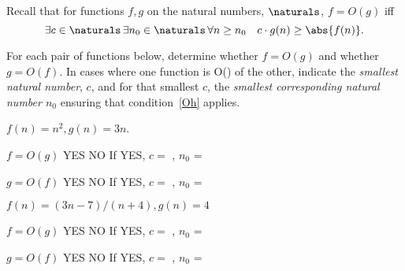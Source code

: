 
\begin{problem}
Recall that for functions $f,g$ on the natural numbers,
$\naturals$, $f = O(g)$ iff
\begin{equation}\label{Oh}
\exists c \in \naturals\, \exists n_0 \in \naturals\,
\forall n \geq n_0\quad c \cdot g(n) \geq \abs{f(n)}.
\end{equation}

For each pair of functions below, determine whether $f = O(g)$ and whether
$g = O(f)$.  In cases where one function is O() of the other, indicate the
\emph{smallest natural number}, $c$, and for that smallest $c$, the
\emph{smallest corresponding natural number $n_0$} ensuring that
condition~\eqref{Oh} applies.

\begin{problemparts}

\problempart $f(n) = n^2, g(n) = 3n$.

$f = O(g)$ \hspace{.5in}YES \hspace{.5in}NO \hspace{.5in} 
If YES, $c =$ \brule{.5in}, $n_0$ = \brule{.5in}


$g = O(f)$ \hspace{.5in}YES \hspace{.5in}NO \hspace{.5in} 
If YES, $c =$ \brule{.5in}, $n_0$ = \brule{.5in}


\problempart $f(n) = (3n - 7) / (n + 4), g(n) = 4$

$f = O(g)$ \hspace{.5in}YES \hspace{.5in}NO \hspace{.5in} 
If YES, $c =$ \brule{.5in}, $n_0$ = \brule{.5in}


$g = O(f)$ \hspace{.5in}YES \hspace{.5in}NO \hspace{.5in} 
If YES, $c =$ \brule{.5in}, $n_0$ = \brule{.5in}



\end{problemparts}
\end{problem}
